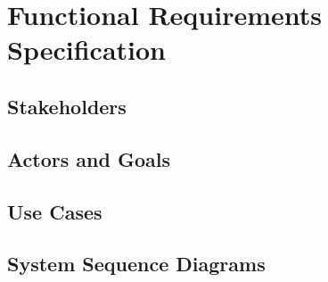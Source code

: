 \chapter{Functional Requirements Specification}


\section{Stakeholders}


\section{Actors and Goals}



\section{Use Cases}



\section{System Sequence Diagrams}

